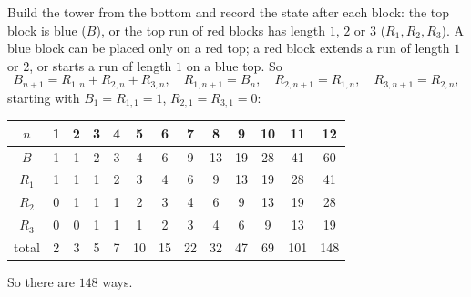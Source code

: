 Build the tower from the bottom and record the state after each block: the top block is blue ($B$), or the top run of red blocks has length $1$, $2$ or $3$ ($R_1,R_2,R_3$). A blue block can be placed only on a red top; a red block extends a run of length $1$ or $2$, or starts a run of length $1$ on a blue top. So
\[B_{n+1}=R_{1,n}+R_{2,n}+R_{3,n},\quad R_{1,n+1}=B_n,\quad R_{2,n+1}=R_{1,n},\quad R_{3,n+1}=R_{2,n},\]
starting with $B_1=R_{1,1}=1$, $R_{2,1}=R_{3,1}=0$:
\begin{center}
\begin{tabular}{c|cccccccccccc}
$n$&1&2&3&4&5&6&7&8&9&10&11&12\\ \hline
$B$&1&1&2&3&4&6&9&13&19&28&41&60\\
$R_1$&1&1&1&2&3&4&6&9&13&19&28&41\\
$R_2$&0&1&1&1&2&3&4&6&9&13&19&28\\
$R_3$&0&0&1&1&1&2&3&4&6&9&13&19\\ \hline
total&2&3&5&7&10&15&22&32&47&69&101&148
\end{tabular}
\end{center}
So there are $\boxed{148}$ ways.
